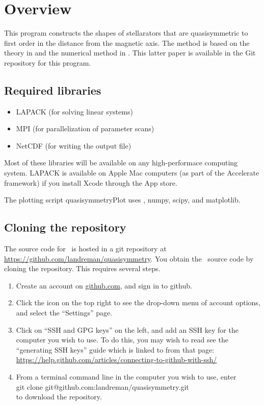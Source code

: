 \chapter{Overview}

This program constructs the shapes of stellarators that are quasisymmetric to first
order in the distance from the magnetic axis.
The method is based on the theory in \cite{GB1,GB2}
and the numerical method in \cite{PaperII}.
This latter paper is available in the Git repository for this program.



\section{Required libraries}

\begin{itemize}

\item {\ttfamily LAPACK} (for solving linear systems)
\item {\ttfamily MPI} (for parallelization of parameter scans)
\item {\ttfamily NetCDF} (for writing the output file)

\end{itemize}

Most of these libraries will be available on any high-performace computing system. {\ttfamily LAPACK}
is available on Apple Mac computers (as part of the Accelerate framework) if you install Xcode through the App store.

The plotting script {\ttfamily quasisymmetryPlot} uses \python,
{\ttfamily numpy}, {\ttfamily scipy}, and {\ttfamily matplotlib}.

\section{Cloning the repository}

The source code for \quasisymmetry~is hosted in a {\ttfamily git} repository at
\url{https://github.com/landreman/quasisymmetry}.
You obtain the \quasisymmetry~source code by cloning the repository. This requires several steps.

\begin{enumerate}
\item Create an account on \url{github.com}, and sign in to {\ttfamily github}.
\item Click the icon on the top right to see the drop-down menu of account options, and select the ``Settings'' page.
\item Click on ``SSH and GPG keys'' on the left, and add an SSH key for the computer you wish to use. To do this, you may wish to read see the ``generating SSH keys'' guide which is linked to from that page: \url{https://help.github.com/articles/connecting-to-github-with-ssh/}
\item From a terminal command line in the computer you wish to use, enter\\
{\ttfamily git clone git@github.com:landreman/quasisymmetry.git}\\
 to download the repository.
\end{enumerate}

